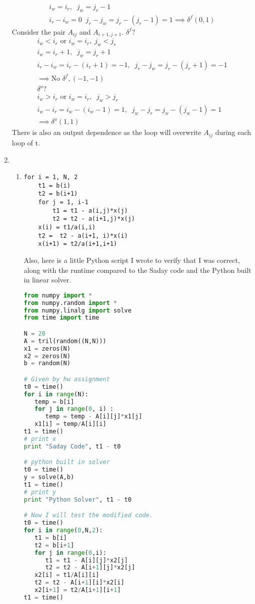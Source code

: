 \documentclass[11pt]{article}
\begin{document}
\begin{enumerate}
\begin{gather*}
i_w = i_r, \;\; j_w = j_r - 1\\
i_r - i_w = 0 \;\; j_r - j_w = j_r - (j_r - 1) = 1 \implies \delta^f(0,1)
\end{gather*}
Consider the pair $A_{ij}$ and $A_{i+1,j+1}$. $\delta^f?$
\begin{gather*}
i_w < i_r \textrm{ or } i_w = i_r, \; j_w < j_r\\
i_w =  i_r + 1, \;\; j_w = j_r + 1\\
i_r - i_w = i_r - (i_r + 1) = -1, \;\; j_r - j_w = j_r - (j_r + 1) = -1\\
\implies \textrm{No } \delta^f, (-1, -1)\\
\delta^a?\\
i_w > i_r \textrm{ or } i_w = i_r, \;\; j_w > j_r\\
i_w - i_r = i_w - (i_w-1) = 1, \;\; j_w - j_r = j_w - (j_w-1) = 1\\
\implies  \delta^a (1,1)
\end{gather*}
There is also an output dependence as the loop will overwrite $A_{ij}$ during each loop of t.
\item 
\begin{enumerate}
\item 
\begin{lstlisting}
for i = 1, N, 2
	t1 = b(i)
	t2 = b(i+1)
	for j = 1, i-1
		t1 = t1 - a(i,j)*x(j)
		t2 = t2 - a(i+1,j)*x(j)
	x(i) = t1/a(i,i)
	t2 =  t2 - a(i+1, i)*x(i)
	x(i+1) = t2/a(i+1,i+1)
\end{lstlisting}
Also, here is a little Python script I wrote to verify that I was correct, along with the runtime compared to the Saday code and the Python built in linear solver.
\begin{lstlisting}[language=Python]
from numpy import *
from numpy.random import *
from numpy.linalg import solve
from time import time

N = 20
A = tril(random((N,N)))
x1 = zeros(N)
x2 = zeros(N)
b = random(N)

# Given by hw assignment
t0 = time()
for i in range(N):
   temp = b[i]
   for j in range(0, i) :
      temp = temp - A[i][j]*x1[j]
   x1[i] = temp/A[i][i]
t1 = time()
# print x
print "Saday Code", t1 - t0

# python built in solver
t0 = time()
y = solve(A,b)
t1 = time()
# print y
print "Python Solver", t1 - t0

# Now I will test the modified code.
t0 = time()
for i in range(0,N,2):
   t1 = b[i]
   t2 = b[i+1]
   for j in range(0,i):
      t1 = t1 - A[i][j]*x2[j]
      t2 = t2 - A[i+1][j]*x2[j]
   x2[i] = t1/A[i][i]
   t2 = t2 - A[i+1][i]*x2[i]
   x2[i+1] = t2/A[i+1][i+1]
t1 = time()


\end{lstlisting}
\end{enumerate}
\end{enumerate}
\end{document}
